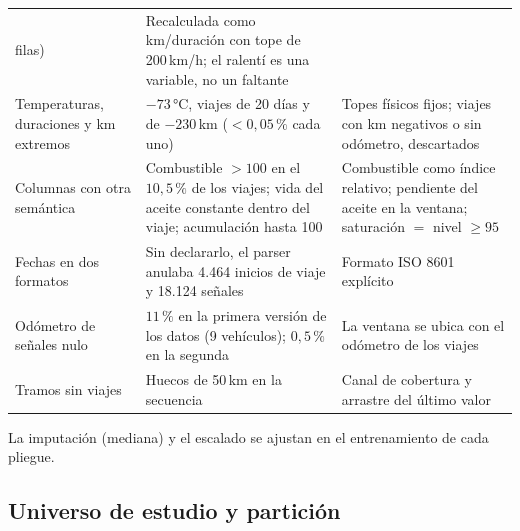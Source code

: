\begin{table}[!htbp]
\begin{tabularx}{\textwidth}{@{}>{\raggedright\arraybackslash}p{3.1cm}>{\raggedright\arraybackslash}X>{\raggedright\arraybackslash}p{4.3cm}@{}}
  filas) & Recalculada como km/duración con tope de 200\,km/h; el ralentí es una variable, no un faltante \\
Temperaturas, duraciones y km extremos & $-73$\,°C, viajes de 20 días y de $-230$\,km ($<0{,}05\,\%$ cada uno) & Topes
  físicos fijos; viajes con km negativos o sin odómetro, descartados \\
Columnas con otra semántica & Combustible $>100$ en el $10{,}5\,\%$ de los viajes; vida del aceite constante dentro del viaje;
  acumulación hasta 100 & Combustible como índice relativo; pendiente del aceite en la ventana; saturación $=$ nivel
  $\ge 95$ \\
Fechas en dos formatos & Sin declararlo, el parser anulaba 4.464 inicios de viaje y 18.124 señales & Formato ISO 8601
  explícito \\
Odómetro de señales nulo & $11\,\%$ en la primera versión de los datos (9 vehículos); $0{,}5\,\%$ en la segunda & La ventana se ubica
  con el odómetro de los viajes \\
Tramos sin viajes & Huecos de 50\,km en la secuencia & Canal de cobertura y arrastre del último valor \\
\bottomrule
\end{tabularx}
\end{table}

La imputación (mediana) y el escalado se ajustan en el entrenamiento de cada pliegue.

\subsection{Universo de estudio y partición}
\label{sec:universo}

